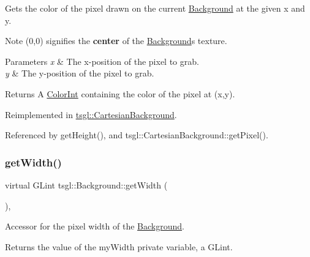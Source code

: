 Gets the color of the pixel drawn on the current \hyperlink{classtsgl_1_1_background}{Background} at the given x and y. 

\begin{DoxyNote}{Note}
(0,0) signifies the {\bfseries center} of the \hyperlink{classtsgl_1_1_background}{Background}\textquotesingle{}s texture. 
\end{DoxyNote}

\begin{DoxyParams}{Parameters}
{\em x} & The x-\/position of the pixel to grab. \\
\hline
{\em y} & The y-\/position of the pixel to grab. \\
\hline
\end{DoxyParams}
\begin{DoxyReturn}{Returns}
A \hyperlink{structtsgl_1_1_color_int}{Color\+Int} containing the color of the pixel at (x,y). 
\end{DoxyReturn}


Reimplemented in \hyperlink{classtsgl_1_1_cartesian_background_a36a3e803d2ffe16e2e1639359f7c7be5}{tsgl\+::\+Cartesian\+Background}.



Referenced by get\+Height(), and tsgl\+::\+Cartesian\+Background\+::get\+Pixel().

\mbox{\label{classtsgl_1_1_background_a7db981b1f06b6294200b115bf47846ec}} 
\subsubsection{\texorpdfstring{get\+Width()}{getWidth()}}
{\footnotesize\ttfamily virtual G\+Lint tsgl\+::\+Background\+::get\+Width (\begin{DoxyParamCaption}{ }\end{DoxyParamCaption})\hspace{0.3cm}{\ttfamily [inline]}, {\ttfamily [virtual]}}



Accessor for the pixel width of the \hyperlink{classtsgl_1_1_background}{Background}. 

Returns the value of the my\+Width private variable, a G\+Lint. \mbox{\label{classtsgl_1_1_background_ae80545e3e31a4e5ec9d2796fc4f66ee8}} 
